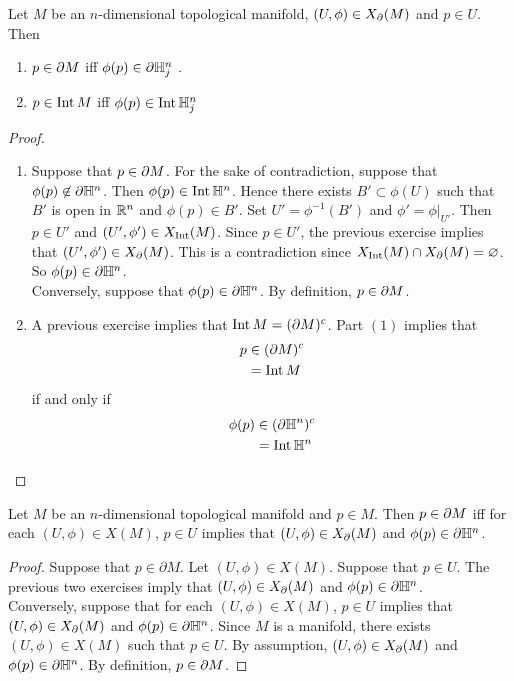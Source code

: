 \documentclass{book}
\begin{document}
	\begin{ex} 
		Let $M$ be an $n$-dimensional topological manifold, $(U, \phi) \in X_{\partial}(M)$ and $p \in U$. Then 
		\begin{enumerate}
			\item $p \in \partial M$ iff $\phi(p) \in \partial \mathbb{H}^n_j $ .
			\item $p \in \operatorname{Int} M$ iff $\phi(p) \in \operatorname{Int} \mathbb{H}^n_j $
		\end{enumerate}
	\end{ex}

	\begin{proof}\
		\begin{enumerate}
			\item Suppose that $p \in \partial M$. For the sake of contradiction, suppose that $\phi(p) \not \in \partial \mathbb{H}^n$. Then $\phi(p) \in \operatorname{Int} \mathbb{H}^n$. Hence there exists $B' \subset \phi(U)$ such that $B'$ is open in $\mathbb{R}^n$ and $\phi(p) \in B'$. Set $U' = \phi^{-1}(B')$ and $\phi' = \phi|_{U'}$. Then $p \in U'$ and $(U', \phi') \in X_{\operatorname{Int}}(M)$. Since $p \in U'$, the previous exercise implies that $(U', \phi') \in X_{\partial}(M)$. This is a contradiction since $X_{\operatorname{Int}}(M) \cap X_{\partial}(M) = \varnothing$. So $\phi(p) \in \partial \mathbb{H}^n$.\\
			Conversely, suppose that $\phi(p) \in \partial \mathbb{H}^n$. By definition, $p \in \partial M$.
			\item A previous exercise implies that $\operatorname{Int} M = (\partial M)^c$. Part $(1)$ implies that 
			\begin{align*}
				p
				& \in (\partial M)^c \\
				& = \operatorname{Int} M
			\end{align*}
			if and only if
			\begin{align*}
				\phi(p)
				& \in (\partial \mathbb{H}^n)^c \\
				& = \operatorname{Int} \mathbb{H}^n
			\end{align*}
		\end{enumerate}
	\end{proof}

	\begin{ex} 
		Let $M$ be an $n$-dimensional topological manifold and $p \in M$. Then $p \in \partial M$ iff for each $(U, \phi) \in X(M)$, $p \in U$ implies that $(U, \phi) \in X_{\partial}(M)$ and $\phi(p) \in \partial \mathbb{H}^n$. \\
	\end{ex}

	\begin{proof}
		Suppose that $p \in \partial M$. Let $(U, \phi) \in X(M)$. Suppose that $p \in U$. The previous two exercises imply that $(U, \phi) \in X_{\partial}(M)$ and $\phi(p) \in \partial \mathbb{H}^n$.\\
		Conversely, suppose that for each $(U, \phi) \in X(M)$, $p \in U$ implies that $(U, \phi) \in X_{\partial}(M)$ and $\phi(p) \in \partial \mathbb{H}^n$. Since $M$ is a manifold, there exists $(U, \phi) \in X(M)$ such that $p \in U$. By assumption, $(U, \phi) \in X_{\partial}(M)$ and $\phi(p) \in \partial \mathbb{H}^n$. By definition, $p \in \partial M$.
	\end{proof} 
	
\end{document}

